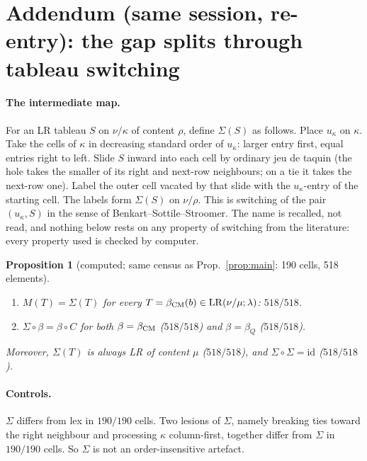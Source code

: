 \documentclass[11pt]{article}
\newtheorem{proposition}[theorem]{Proposition}
\theoremstyle{definition}
\begin{document}
\section{Addendum (same session, re-entry): the gap splits through tableau switching}\label{sec:split}
\paragraph{The intermediate map.} For an LR tableau $S$ on $\nu/\kappa$ of content $\rho$, define $\Sigma(S)$ as follows.
Place $u_\kappa$ on $\kappa$. Take the cells of $\kappa$ in decreasing standard order of $u_\kappa$: larger entry
first, equal entries right to left. Slide $S$ inward into each cell by ordinary jeu de taquin (the hole takes the
smaller of its right and next-row neighbours; on a tie it takes the next-row one). Label the outer cell vacated
by that slide with the $u_\kappa$-entry of the starting cell. The labels form $\Sigma(S)$ on $\nu/\rho$. This is
switching of the pair $(u_\kappa,S)$ in the sense of Benkart--Sottile--Stroomer. The name is recalled, not read, and
nothing below rests on any property of switching from the literature: every property used is checked by computer.

\begin{proposition}[computed; same census as Prop.~\ref{prop:main}: 190 cells, 518 elements]\label{prop:split}
\begin{enumerate}
\item[(H1)] $M(T)=\Sigma(T)$ for every $T=\beta_{\rm CM}(b)\in\mathrm{LR}(\nu/\mu;\lambda)$: $518/518$.
\item[(H2)] $\Sigma\circ\beta=\beta\circ C$ for \emph{both} $\beta=\beta_{\rm CM}$ ($518/518$) and $\beta=\beta_Q$ ($518/518$).
\end{enumerate}
Moreover, $\Sigma(T)$ is always LR of content $\mu$ ($518/518$), and $\Sigma\circ\Sigma=\mathrm{id}$ ($518/518$).
\end{proposition}
\paragraph{Controls.} $\Sigma$ differs from lex in $190/190$ cells. Two lesions of $\Sigma$, namely breaking ties toward
the right neighbour and processing $\kappa$ column-first, together differ from $\Sigma$ in $190/190$ cells. So $\Sigma$
is not an order-insensitive artefact.
\end{document}
